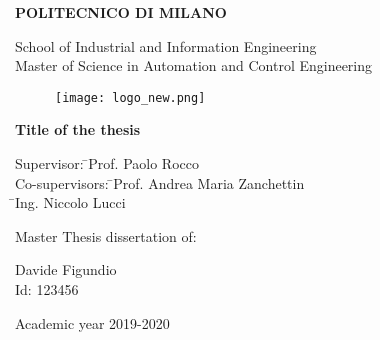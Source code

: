 \begin{titlepage} %
    \begin{center} %
    \LARGE \textbf{POLITECNICO DI MILANO}\\
    \vspace{0.1cm} %
    
    
    \large School of Industrial and Information Engineering\\Master of Science in Automation and Control Engineering
    \vspace{1cm}
    
    \begin{figure}[!h]\centering\texttt{[image: logo\_new.png]}\end{figure}
    \vspace{.8cm}
    
    {\LARGE \textbf{Title of the thesis}} %
    
    \end{center} %
    \vspace{1.2cm}
    
    \begin{flushleft}
        \begin{tabbing}
            \large{Supervisor: \hspace{1.25cm}}\=\large{Prof. Paolo Rocco}\\
            \large{Co-supervisors: \hspace{0.3cm}}\=\large{Prof. Andrea Maria Zanchettin}\\
            \large{\hspace{4cm}}\=\large{Ing. Niccolo Lucci}\\
        \end{tabbing}
    \end{flushleft}
    
    \vspace{0.5cm}
    
    \large \begin{flushright} %
    Master Thesis dissertation of:
    \end{flushright}
    \vspace{-0.9cm}
    \large \begin{flushright} 
    Davide Figundio\\
    Id: 123456
    \end{flushright}
    
    \vspace{\fill}
    \begin{center}
    {Academic year 2019-2020}\end{center}
    
    \end{titlepage} %